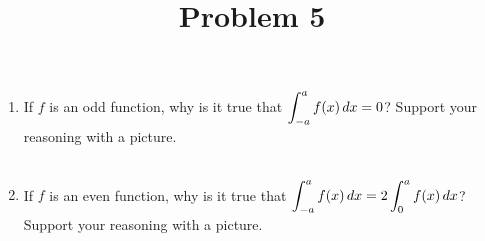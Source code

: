 \documentclass{ximera}
\title[Problem 5]{Problem 5}
\begin{document}
\begin{abstract} \end{abstract}
\maketitle

\begin{problem}

  \begin{enumerate}
    \item
    If $f$ is an odd function, why is it true that $\displaystyle \int_{-a}^a f(x) \,d x = 0$?  
    Support your reasoning with a picture. \\ \\

\item
      If $f$ is an even function, why is it true that $\displaystyle \int_{-a}^a f(x) \,d x = 2 \displaystyle \int_0^a f(x) \,d x$?
      Support your reasoning with a picture.
      
\end{enumerate}
\end{problem}
\end{document}
